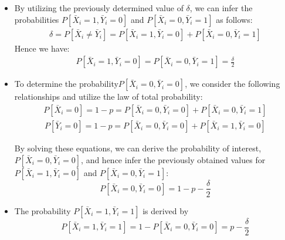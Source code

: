 \begin{itemize}
    \item By utilizing the previously determined value of $\delta$, we can infer the probabilities \(P[\bar{X}_i = 1, \bar{Y}_i = 0]\) and \(P[\bar{X}_i = 0, \bar{Y}_i = 1]\) as follows: 
    \begin{equation*}
        \begin{aligned}
            \delta = P[\bar{X}_i \neq \bar{Y}_i] = P[\bar{X}_i = 1, \bar{Y}_i = 0] + P[\bar{X}_i = 0, \bar{Y}_i = 1]
        \end{aligned}
    \end{equation*}
    Hence we have:
    \begin{equation*}
        \begin{aligned}
            P[\bar{X}_i = 1, \bar{Y}_i = 0] = P[\bar{X}_i = 0, \bar{Y}_i = 1] = \frac{\delta}{2}
        \end{aligned}
    \end{equation*}
    \item To determine the probability\(P[\bar{X}_i = 0, \bar{Y}_i = 0]\), we consider the following relationships and utilize the law of total probability:
    \begin{equation*}
        \begin{aligned}
            P[\bar{X}_i = 0] = 1-p = P[\bar{X}_i = 0, \bar{Y}_i = 0] + P[\bar{X}_i = 0, \bar{Y}_i = 1]
        \end{aligned}
    \end{equation*} 
    \begin{equation*}
        \begin{aligned}
            P[\bar{Y}_i = 0] = 1-p = P[\bar{X}_i = 0, \bar{Y}_i = 0] + P[\bar{X}_i = 1, \bar{Y}_i = 0]
        \end{aligned}
    \end{equation*} 
    
    By solving these equations, we can derive the probability of interest, \\\(P[\bar{X}_i = 0, \bar{Y}_i = 0]\), and hence infer the previously obtained values for \\\(P[\bar{X}_i = 1, \bar{Y}_i = 0]\) and \(P[\bar{X}_i = 0, \bar{Y}_i = 1]\):
    \[ P[\bar{X}_i = 0, \bar{Y}_i = 0] = 1-p - \frac{\delta}{2} \] 

    \item The probability \(P[\bar{X}_i = 1, \bar{Y}_i = 1]\) is derived by 
    \[P[\bar{X}_i = 1, \bar{Y}_i = 1] = 1 - P[\bar{X}_i = 0, \bar{Y}_i = 0] = p-\frac{\delta}{2}\]

\end{itemize}

